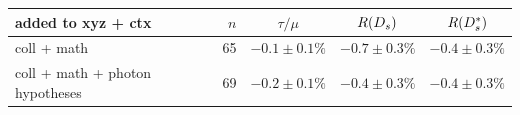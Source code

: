 \begin{tabular}{lr|ccc}
\toprule
added to xyz + ctx & $n$ & $\tau/\mu$ & $R(D_s)$ & $R(D_s^*)$ \\
\midrule
coll + math & 65 & $-0.1\pm0.1\%$ & $-0.7\pm0.3\%$ & $-0.4\pm0.3\%$ \\
coll + math + photon hypotheses & 69 & $-0.2\pm0.1\%$ & $-0.4\pm0.3\%$ & $-0.4\pm0.3\%$ \\
\bottomrule
\end{tabular}
